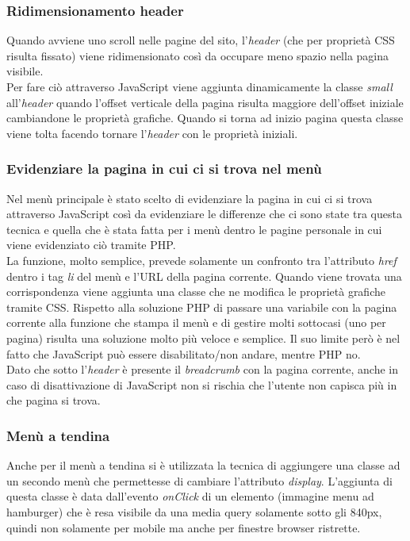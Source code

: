 		\subsubsection{Ridimensionamento header}
		Quando avviene uno scroll nelle pagine del sito, l'\emph{header} (che per proprietà CSS risulta fissato) viene ridimensionato così da occupare meno spazio nella pagina visibile. \\
		Per fare ciò attraverso JavaScript viene aggiunta dinamicamente la classe \emph{small} all'\emph{header} quando l'offset verticale della pagina risulta maggiore dell'offset iniziale cambiandone le proprietà grafiche.
		Quando si torna ad inizio pagina questa classe viene tolta facendo tornare l'\emph{header} con le proprietà iniziali.
		
		\subsubsection{Evidenziare  la pagina in cui ci si trova nel menù}
		Nel menù principale è stato scelto di evidenziare la pagina in cui ci si trova attraverso JavaScript così da evidenziare le differenze che ci sono state tra questa tecnica e quella che è stata fatta per i menù dentro le pagine personale in cui viene evidenziato ciò tramite PHP.\\
		La funzione, molto semplice, prevede solamente un confronto tra l'attributo \emph{href} dentro i tag \emph{li} del menù e l'URL della pagina corrente. Quando viene trovata una corrispondenza viene aggiunta una classe che ne modifica le proprietà grafiche tramite CSS.
		Rispetto alla soluzione PHP di passare una variabile con la pagina corrente alla funzione che stampa il menù e di gestire molti sottocasi (uno per pagina) risulta una soluzione molto più veloce e semplice. Il suo limite però è nel fatto che JavaScript può essere disabilitato/non andare, mentre PHP no.\\
		Dato che sotto l'\emph{header} è presente il \emph{breadcrumb} con la pagina corrente, anche in caso di disattivazione di JavaScript non si rischia che l'utente non capisca più in che pagina si trova.
		
		\subsubsection{Menù a tendina}
		Anche per il menù a tendina si è utilizzata la tecnica di aggiungere una classe ad un secondo menù che permettesse di cambiare l'attributo \emph{display}. L'aggiunta di questa classe è data dall'evento \emph{onClick} di un elemento (immagine menu ad hamburger) che è resa visibile da una media query solamente sotto gli 840px, quindi non solamente per mobile ma anche per finestre browser ristrette.
		

		


